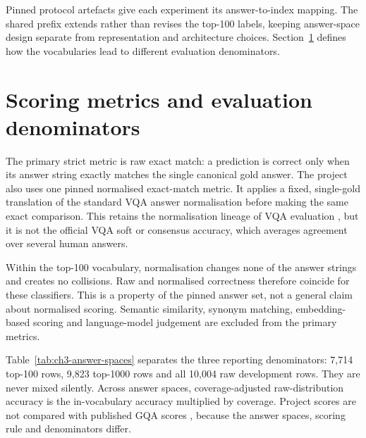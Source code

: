 Pinned protocol artefacts give each experiment its answer-to-index mapping. The shared prefix extends rather than revises the top-100 labels, keeping answer-space design separate from representation and architecture choices. Section~\ref{sec:ch3-scoring} defines how the vocabularies lead to different evaluation denominators.

\section{Scoring metrics and evaluation denominators}
\label{sec:ch3-scoring}
The primary strict metric is raw exact match: a prediction is correct only when its answer string exactly matches the single canonical gold answer. The project also uses one pinned normalised exact-match metric. It applies a fixed, single-gold translation of the standard VQA answer normalisation before making the same exact comparison. This retains the normalisation lineage of VQA evaluation \citep{antol2015vqa}, but it is not the official VQA soft or consensus accuracy, which averages agreement over several human answers.

Within the top-100 vocabulary, normalisation changes none of the answer strings and creates no collisions. Raw and normalised correctness therefore coincide for these classifiers. This is a property of the pinned answer set, not a general claim about normalised scoring. Semantic similarity, synonym matching, embedding-based scoring and language-model judgement are excluded from the primary metrics.

Table~\ref{tab:ch3-answer-spaces} separates the three reporting denominators: 7,714 top-100 rows, 9,823 top-1000 rows and all 10,004 raw development rows. They are never mixed silently. Across answer spaces, coverage-adjusted raw-distribution accuracy is the in-vocabulary accuracy multiplied by coverage. Project scores are not compared with published GQA scores \citep{hudson2019gqa}, because the answer spaces, scoring rule and denominators differ.

\begin{table}[htbp]
\centering
\caption{Answer-space coverage and evaluation roles. Coverage values are design properties, not model-accuracy results.}
\label{tab:ch3-answer-spaces}
\begingroup
\scriptsize
\setlength{\tabcolsep}{2pt}
\renewenvironment{longtable}[1]
  {\begin{tabular}{|p{0.12\textwidth}|p{0.09\textwidth}|p{0.13\textwidth}|p{0.08\textwidth}|p{0.23\textwidth}|p{0.25\textwidth}|}}
  {\end{tabular}}
\let\endhead\relax

\endgroup
\end{table}

